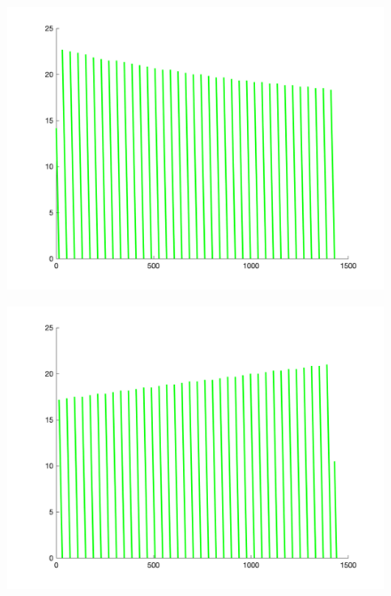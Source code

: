 \documentclass[withoutpreface,bwprint]{cumcmthesis} %
\begin{document}
\begin{figure}[H]
\begin{minipage}[c]{0.35\textwidth}
        \includegraphics[width=1\textwidth]{figures/2-2-5-up.png}
    \label{fig:my_label}
    \end{minipage}
\begin{minipage}[c]{0.35\textwidth}
    \includegraphics[width=1\textwidth]{figures/2-2-5-down.png}
    \label{fig:my_label}
      \end{minipage}
     \begin{minipage}[c]{0.35\textwidth}

\end{minipage}
\end{figure}
\end{document}

